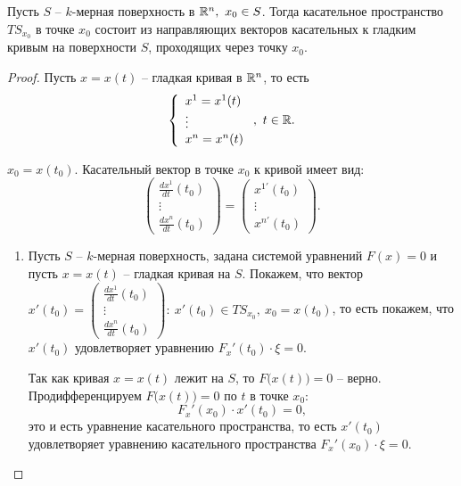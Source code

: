 

\begin{theorem}\label{theorem:2}
    Пусть $S$ -- $k$-мерная поверхность в $\mathbb{R}^n, \ x_0 \in S$. Тогда касательное пространство $TS_{x_0}$ в точке $x_0$ состоит из направляющих векторов касательных к гладким кривым на поверхности $S$, проходящих через точку $x_0$.
\end{theorem}

\begin{proof}
    Пусть $x = x(t)$ -- гладкая кривая в $\mathbb{R}^n$, то есть
    \[
        \left\{\begin{array}{l}
            x^1 = x^1(t) \\
            \vdots       \\
            x^n = x^n(t)
        \end{array}\right., \ t \in \mathbb{R}.
    \]

    $ x_0 = x(t_0) $. Касательный вектор в точке $x_0$ к кривой имеет вид:
    \[
        \left(\begin{matrix}
                \frac{dx^1}{dt}(t_0) \\
                \vdots               \\
                \frac{dx^n}{dt}(t_0)
            \end{matrix}\right) = \left(\begin{matrix}
                x^{1'}(t_0) \\
                \vdots      \\
                x^{n'}(t_0)
            \end{matrix}\right).
    \]
    \begin{enumerate}
        \item Пусть $S$ -- $k$-мерная поверхность, задана системой уравнений $F(x) = 0$ и пусть $x = x(t)$ -- гладкая кривая на $S$. Покажем, что вектор $x'(t_0) = \left(\begin{matrix}
                          \frac{dx^1}{dt}(t_0) \\
                          \vdots               \\
                          \frac{dx^n}{dt}(t_0)
                      \end{matrix}\right): \ x'(t_0) \in TS_{x_0}, \ x_0 = x(t_0)$, то есть покажем, что $x'(t_0)$ удовлетворяет уравнению $F_x'(t_0)\cdot \xi=0$.

              Так как кривая $x = x(t)$ лежит на $S$, то $F\big(x(t)\big) = 0$ -- верно. Продифференцируем $F\big(x(t)\big) = 0$ по $t$ в точке $x_0$:
              \[
                  F_x'(x_0) \cdot x'(t_0) = 0,
              \]
              это и есть уравнение касательного пространства, то есть $x'(t_0)$ удовлетворяет уравнению касательного пространства $F_x'(x_0)\cdot \xi = 0$.


\end{enumerate}
\end{proof}
